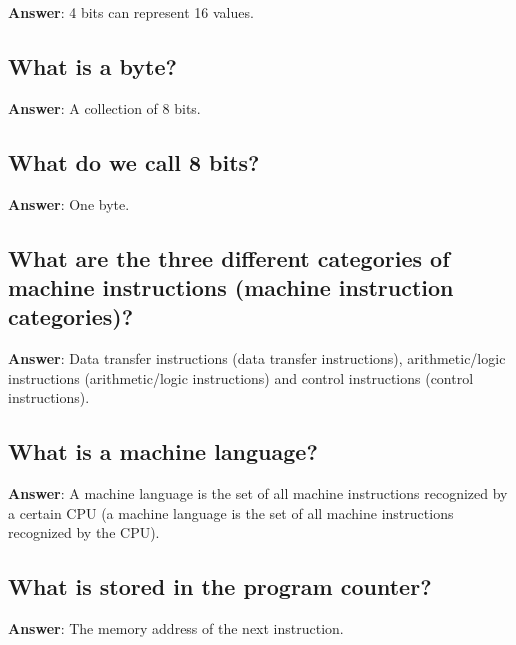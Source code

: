 \documentclass[a4paper,11pt,oneside]{article}
\begin{document}
\begin{sloppypar}
\label{q:90:sa:en:True}

\textbf{Answer}: 4 bits can represent 16 values.



\subsection{What is a byte?}

\label{q:91:sa:en:True}

\textbf{Answer}: A collection of 8 bits.



\subsection{What do we call 8 bits?}

\label{q:92:sa:en:True}

\textbf{Answer}: One byte.



\subsection{What are the three different categories of machine instructions (machine instruction categories)?}

\label{q:93:sa:en:True}

\textbf{Answer}: Data transfer instructions (data transfer instructions), arithmetic/logic instructions (arithmetic/logic instructions) and control instructions (control instructions).



\subsection{What is a machine language?}

\label{q:94:sa:en:True}

\textbf{Answer}: A machine language is the set of all machine instructions recognized by a certain CPU (a machine language is the set of all machine instructions recognized by the CPU).



\subsection{What is stored in the program counter?}

\label{q:95:sa:en:True}

\textbf{Answer}: The memory address of the next instruction.




\end{sloppypar}
\end{document}
